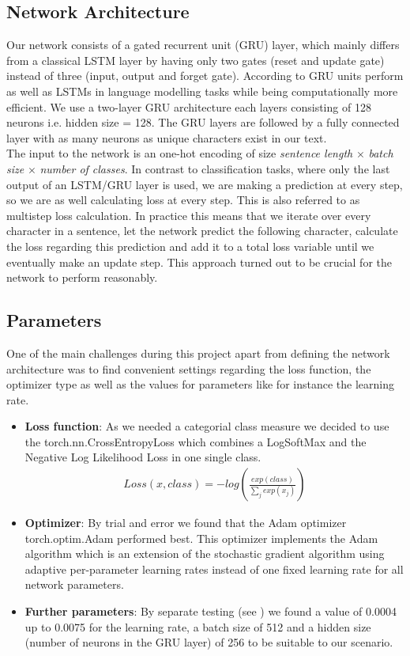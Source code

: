 \documentclass[11pt,a4paper,bibliography=totocnumbered,listof=totocnumbered]{scrartcl}
\begin{document}
\subsection{Network Architecture} \label{ssec:na}
Our network consists of a gated recurrent unit (GRU) layer, which mainly differs from a classical LSTM layer by having only two gates (reset and update gate) instead of three (input, output and forget gate). According to GRU units perform as well as LSTMs in language modelling tasks while being computationally more efficient. We use a two-layer GRU architecture each layers consisting of 128 neurons i.e. hidden size = 128. The GRU layers are followed by a fully connected layer with as many neurons as unique characters exist in our text. \\
The input to the network is an one-hot encoding of size \textit{sentence length} $\times$ \textit{batch size} $\times$ \textit{number of classes}. In contrast to classification tasks, where only the last output of an LSTM/GRU layer is used, we are making a prediction at every step, so we are as well calculating loss at every step. This is also referred to as multistep loss calculation. In practice this means that we iterate over every character in a sentence, let the network predict the following character, calculate the loss regarding this prediction and add it to a total loss variable until we eventually make an update step. This approach turned out to be crucial for the network to perform reasonably.

\subsection{Parameters}
One of the main challenges during this project apart from defining the network architecture was to find convenient settings regarding the loss function, the optimizer type as well as the values for parameters like for instance the learning rate.  
\begin{itemize}
	\item \textbf{Loss function}: As we needed a categorial class measure we decided to use the torch.nn.CrossEntropyLoss which combines a LogSoftMax and the Negative Log Likelihood Loss in one single class. 
	\begin{align*}
		Loss(x, class) = -log \left( \frac{exp(class)}{\sum_j exp(x_j)} \right)
	\end{align*}	 

	\item \textbf{Optimizer}: By trial and error we found that the Adam optimizer torch.optim.Adam performed best. This optimizer implements the Adam algorithm which is an extension of the stochastic gradient algorithm using adaptive per-parameter learning rates instead of one fixed learning rate for all network parameters. 
	
	\item \textbf{Further parameters}: By separate testing (see ) we found a value of 0.0004 up to 0.0075 for the learning rate, a batch size of 512 and a hidden size (number of neurons in the GRU layer) of 256 to be suitable to our scenario. 
\end{itemize}
\end{document}
